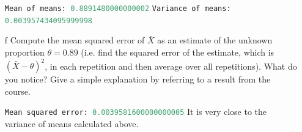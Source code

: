 \documentclass{article}
\newcommand{\1}{\mathbf{1}}
\begin{document}
\begin{itemize}
    \lstinline[language=Python]{Mean of means: 0.8891480000000002}\newline
    \lstinline[language=Python]{Variance of means: 0.003957434095999998}

    \item[f] Compute the mean squared error of $\bar{X}$ as an estimate of the unknown proportion $\theta=0.89$ (i.e. find the squared error of the estimate, which is $(\bar{X} - \theta)^2$, in each repetition and then average over all repetitions). What do you notice? Give a simple explanation by referring to a result from the course.
    
    \lstinline[language=Python]{Mean squared error: 0.0039581600000000005} \newline
    It is very close to the variance of means calculated above. 
    
    \end{itemize}

\newpage
\end{document}
